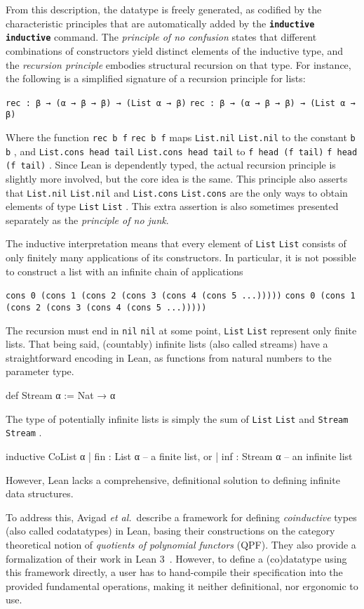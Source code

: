 \documentclass[titlepage]{report}
\newcommand\lean[1]{%
\ifx\leanmode\undefined%
\def\leanmode{1}%
\texttt{\small #1}%
\undef\leanmode%
\else%
\texttt{#1}%
\fi%
}
\newcommand\keyword[1]{{\color{keywordcolor} \textbf{\lean{#1}}}}
\newcommand\inductive{{\keyword{inductive}}}
\newcommand\etal{\emph{et al.}}
\begin{document}
From this description, the datatype is freely generated, as codified by the characteristic principles that are automatically added by the \inductive{} command.
The \emph{principle of no confusion} states that different combinations of constructors yield distinct elements of the inductive type, and the \emph{recursion principle} embodies structural recursion on that type. For instance, the following is a simplified signature of a recursion principle for lists:
\begin{center}
    \lean{rec : β → (α → β → β) → (List α → β)}
\end{center}
Where the function \lean{rec b f} maps \lean{List.nil} to the constant \lean{b}, and \lean{List.cons head tail} to \lean{f head (f tail)}. Since Lean is dependently typed, the actual recursion principle is slightly more involved, but the core idea is the same.
This principle also asserts that \lean{List.nil} and \lean{List.cons} are the only ways to obtain elements of type \lean{List}. This extra assertion is also sometimes presented separately as the \emph{principle of no junk}.


The inductive interpretation means that every element of \lean{List} consists of only
finitely many applications of its constructors. In particular, it is not possible
to construct a list with an infinite chain of  applications
\begin{center}
    \lean{cons 0 (cons 1 (cons 2 (cons 3 (cons 4 (cons 5 ...)))))}
\end{center}
The recursion must end in \lean{nil} at some point, \lean{List} represent only finite lists.
That being said, (countably) infinite lists (also called streams) have a straightforward encoding in Lean, as functions from natural numbers to the parameter type.
\begin{leancode}
    def Stream α := Nat → α
\end{leancode}

The type of potentially infinite lists is simply the sum of \lean{List} and \lean{Stream}.
\begin{leancode}
  inductive CoList α
    | fin : List α      -- a finite list, or
    | inf : Stream α    -- an infinite list
\end{leancode}

However, Lean lacks a comprehensive, definitional solution to defining infinite data structures.

To address this, Avigad \etal{}\ describe a framework for defining \emph{coinductive} types (also called codatatypes) in Lean,
basing their constructions on the category theoretical notion of \emph{quotients of polynomial functors} (QPF).
They also provide a formalization of their work in Lean 3~\cite{avigadDataTypesQuotients2019a}.
However, to define a (co)datatype using this framework directly, a user has to hand-compile their specification 
into the provided fundamental operations, making it neither definitional, nor ergonomic to use.
\end{document}
